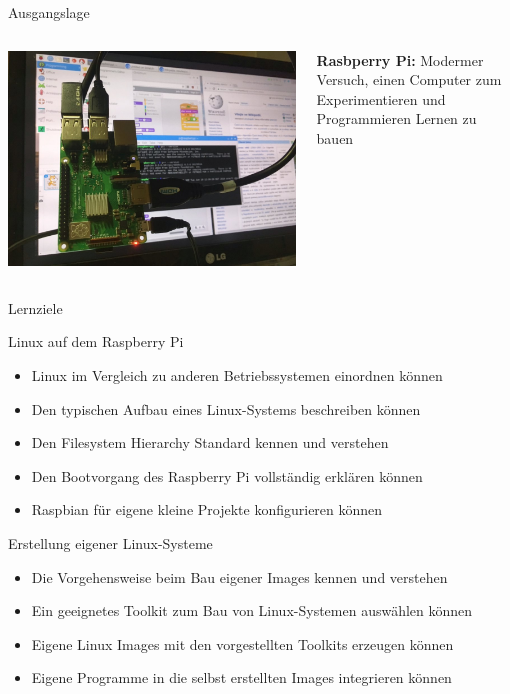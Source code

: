 {\begin{frame}{Ausgangslage}
\begin{columns}[b,onlytextwidth]
        \begin{center}
            \includegraphics[width=.85\textwidth]{8-linux/img/raspi}
        \end{center}
        \parbox{\linewidth}{
            \footnotesize
            \textbf{Rasbperry Pi:} Modermer Versuch, einen Computer zum
            Experimentieren und Programmieren Lernen zu bauen
        }
    \end{columns}
\end{frame}
}

\begin{frame}{Lernziele}
    \begin{block}{Linux auf dem Raspberry Pi}
        \begin{itemize}
            \item Linux im Vergleich zu anderen Betriebssystemen einordnen können
            \item Den typischen Aufbau eines Linux-Systems beschreiben können
            \item Den Filesystem Hierarchy Standard kennen und verstehen
            \item Den Bootvorgang des Raspberry Pi vollständig erklären können
            \item Raspbian für eigene kleine Projekte konfigurieren können
        \end{itemize}
    \end{block}

    \begin{block}{Erstellung eigener Linux-Systeme}
        \begin{itemize}
            \item Die Vorgehensweise beim Bau eigener Images kennen und verstehen
            \item Ein geeignetes Toolkit zum Bau von Linux-Systemen auswählen können
            \item Eigene Linux Images mit den vorgestellten Toolkits erzeugen können
            \item Eigene Programme in die selbst erstellten Images integrieren können
        \end{itemize}
    \end{block}
\end{frame}

